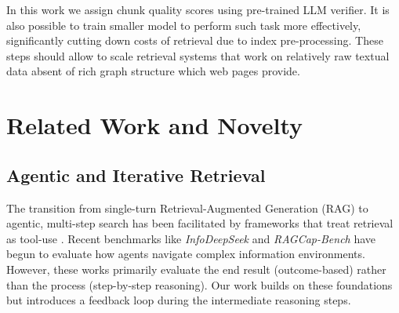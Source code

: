 \documentclass[11pt]{article}
\begin{document}
\noindent
In this work we assign chunk quality scores using pre-trained LLM verifier. It is also possible to train smaller model to perform such task more effectively, significantly cutting down costs of retrieval due to index pre-processing. These steps should allow to scale retrieval systems that work on relatively raw textual data absent of rich graph structure which web pages provide.



\section{Related Work and Novelty}

\subsection{Agentic and Iterative Retrieval}
The transition from single-turn Retrieval-Augmented Generation (RAG) to agentic, multi-step search has been facilitated by frameworks that treat retrieval as tool-use \citep{schick2023toolformerlanguagemodelsteach}. Recent benchmarks like \textit{InfoDeepSeek} \citep{xi2025infodeepseekbenchmarkingagenticinformation} and \textit{RAGCap-Bench} \citep{lin2025ragcapbenchbenchmarkingcapabilitiesllms} have begun to evaluate how agents navigate complex information environments. However, these works primarily evaluate the end result (outcome-based) rather than the process (step-by-step reasoning). Our work builds on these foundations but introduces a feedback loop during the intermediate reasoning steps.
\end{document}
